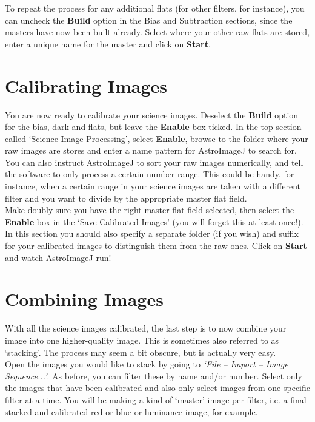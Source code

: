 \documentclass[12pt,twoside,a4paper]{report}
\begin{document}
To repeat the process for any additional flats (for other filters, for instance), you can uncheck the \textbf{Build} option in the Bias and Subtraction sections, since the masters have now been built already. Select where your other raw flats are stored, enter a unique name for the master and click on \textbf{Start}.

\section{Calibrating Images}

You are now ready to calibrate your science images. Deselect the \textbf{Build} option for the bias, dark and flats, but leave the \textbf{Enable} box ticked. In the top section called `Science Image Processing', select \textbf{Enable}, browse to the folder where your raw images are stores and enter a name pattern for AstroImageJ to search for. You can also instruct AstroImageJ to sort your raw images numerically, and tell the software to only process a certain number range. This could be handy, for instance, when a certain range in your science images are taken with a different filter and you want to divide by the appropriate master flat field.\\

Make doubly sure you have the right master flat field selected, then select the \textbf{Enable} box in the `Save Calibrated Images' (you will forget this at least once!). In this section you should also specify a separate folder (if you wish) and suffix for your calibrated images to distinguish them from the raw ones. Click on \textbf{Start} and watch AstroImageJ run!

\section{Combining Images}
\label{combining}

With all the science images calibrated, the last step is to now combine your image into one higher-quality image. This is sometimes also referred to as `stacking'. The process may seem a bit obscure, but is actually very easy.\\

Open the images you would like to stack by going to \emph{`File -- Import -- Image Sequence...'}. As before, you can filter these by name and/or number. Select only the images that have been calibrated and also only select images from one specific filter at a time. You will be making a kind of `master' image per filter, i.e. a final stacked and calibrated red or blue or luminance image, for example.\\
\end{document}
